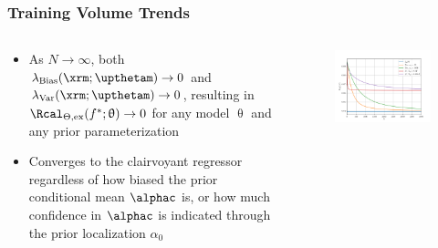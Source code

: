 \documentclass[aspectratio=169]{beamer}
\begin{document}
\begin{frame}
\frametitle{Training Volume Trends}

\begin{columns}[c]

\begin{column}{.5\linewidth}

\begin{itemize}
\item As $N \to \infty$, both $\lambda_{\text{Bias}}(\xrm; \upthetam) \to 0$ and $\lambda_{\text{Var}}(\xrm; \upthetam) \to 0$, resulting in $\Rcal_{\Theta, \mathrm{ex}}(f^* ; \uptheta) \to 0$ for \alert{any} model $\uptheta$ and \alert{any} prior parameterization
\item Converges to the clairvoyant regressor regardless of how biased the prior conditional mean $\alphac$ is, or how much confidence in $\alphac$ is indicated through the prior localization $\alpha_0$
\end{itemize}


\end{column}

\begin{column}{.5\linewidth}

\begin{figure}
	\centering
	\includegraphics[width=1\linewidth]{Discrete/SE/risk_N_leg_a0.png}
	\label{fig:Discrete/SE/risk_N_leg_a0}
\end{figure}

\end{column}

\end{columns}

\end{frame}
\end{document}
